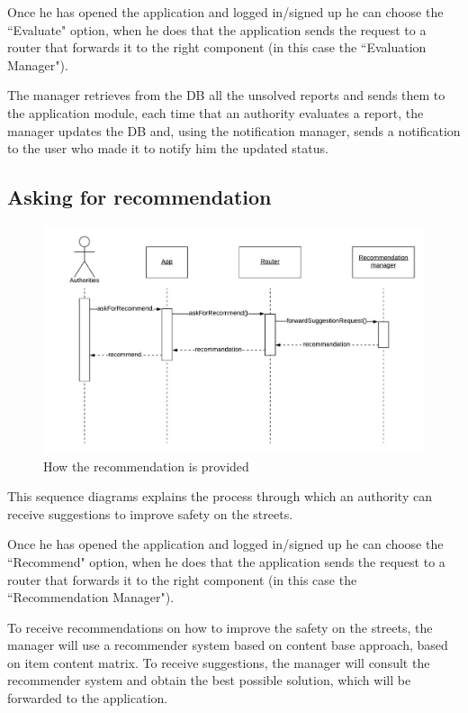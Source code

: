 \documentclass[12pt,a4paper]{report}
\begin{document}
				Once he has opened the application and logged in/signed up he can choose the ``Evaluate" option,
				when he does that the application sends the request to a router that forwards it to the right
				component (in this case the ``Evaluation Manager").


				The manager retrieves from the DB all the unsolved reports and sends them to the application module, each
				time that an authority evaluates a report, the manager updates the DB and, using the notification manager, sends
				a notification to the user who made it to notify him the updated status.
			\subsection{Asking for recommendation}
				\begin{figure}[H]
						\includegraphics[width = \textwidth, center]{recommendation}
						\caption{How the recommendation is provided}
						\label{fig: diagrams}
				\end{figure}
				This sequence diagrams explains the process through which an authority can receive suggestions to improve safety on the streets.


				Once he has opened the application and logged in/signed up he can choose the ``Recommend" option,
				when he does that the application sends the request to a router that forwards it to the right
				component (in this case the ``Recommendation Manager").


				To receive recommendations on how to improve the safety on the streets, the manager will use a recommender
				system based on content base approach, based on item content matrix. To receive suggestions, the manager
				will consult the recommender system and obtain the best possible solution, which will be forwarded to the
				application.
\end{document}
